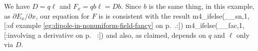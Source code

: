 We have $D=q\ell$ and $F_x=qb\ell=Db$. Since $b$ is the same thing, in this example,
as $\partial E_x/\partial x$, our equation for $F$ is
is consistent with the result 
m4_ifelse(__sn,1,[:of example                                   
        \ref{eg:dipole-in-nonuniform-field-fancy} on p.~\pageref{eg:dipole-in-nonuniform-field-fancy}.:])%
m4_ifelse(__fac,1,[:involving a derivative on p.~\pageref{force-on-dipole-in-nonuniform-field} :])%
and also, as claimed, depends on $q$ and $\ell$ only via $D$.
